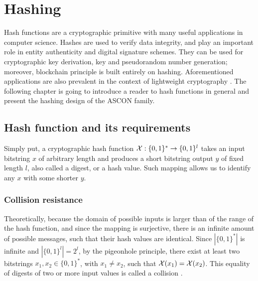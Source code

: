 

\section{Hashing}
Hash functions are a cryptographic primitive with many useful applications in computer science. Hashes are used to verify data integrity, and play an important role in entity authenticity and digital signature schemes. They can be used for cryptographic key derivation, key and pseudorandom number generation; moreover, blockchain principle is built entirely on hashing. Aforementioned applications are also prevalent in the context of lightweight cryptography \cite{lightHashTrends}. The following chapter is going to introduce a reader to hash functions in general and present the hashing design of the ASCON family.

\subsection{Hash function and its requirements}
Simply put, a cryptographic hash function $ \mathcal{X}: \{0, 1\}^* \rightarrow \{0,1\}^{l} $ takes an input bitstring $x$ of arbitrary length and produces a short bitstring output $y$ of fixed length $l$, also called a digest, or a hash value. Such mapping allows us to identify any $x$ with some shorter $y$. 

\subsubsection{Collision resistance}
Theoretically, because the domain of possible inputs is larger than of the range of the hash function, and since the mapping is surjective, there is an infinite amount of possible messages, such that their hash values are identical. Since $ |\{0,1\}^*| $ is infinite and $ |\{0,1\}^l| = 2^l $, by the pigeonhole principle, there exist at least two bitstrings $ x_1, x_2 \in \{0,1\}^* $, with $ x_1 \neq x_2 $, such that $ \mathcal{X}(x_1) = \mathcal{X}(x_2) $. This equality of digests of two or more input values is called a collision \cite{knospeCourseCryptography2019}.

